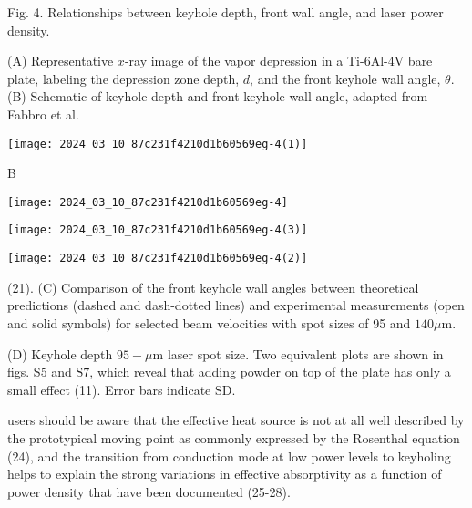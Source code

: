 \documentclass[10pt]{article}
\begin{document}
Fig. 4. Relationships between keyhole depth, front wall angle, and laser power density.

(A) Representative $x$-ray image of the vapor depression in a Ti-6Al-4V bare plate, labeling the depression zone depth, $d$, and the front keyhole wall angle, $\theta$. (B) Schematic of keyhole depth and front keyhole wall angle, adapted from Fabbro et al.

\begin{center}
\texttt{[image: 2024\_03\_10\_87c231f4210d1b60569eg-4(1)]}
\end{center}

B

\begin{center}
\texttt{[image: 2024\_03\_10\_87c231f4210d1b60569eg-4]}
\end{center}

\begin{center}
\texttt{[image: 2024\_03\_10\_87c231f4210d1b60569eg-4(3)]}
\end{center}

\begin{center}
\texttt{[image: 2024\_03\_10\_87c231f4210d1b60569eg-4(2)]}
\end{center}

(21). (C) Comparison of the front keyhole wall angles between theoretical predictions (dashed and dash-dotted lines) and experimental measurements (open and solid symbols) for selected beam velocities with spot sizes of 95 and $140 \mu \mathrm{m}$.

(D) Keyhole depth $95-\mu \mathrm{m}$ laser spot size. Two equivalent plots are shown in figs. S5 and $\mathrm{S} 7$, which reveal that adding powder on top of the plate has only a small effect (11). Error bars indicate SD.

users should be aware that the effective heat source is not at all well described by the prototypical moving point as commonly expressed by the Rosenthal equation (24), and the transition from conduction mode at low power levels to keyholing helps to explain the strong variations in effective absorptivity as a function of power density that have been documented (25-28).
\end{document}
